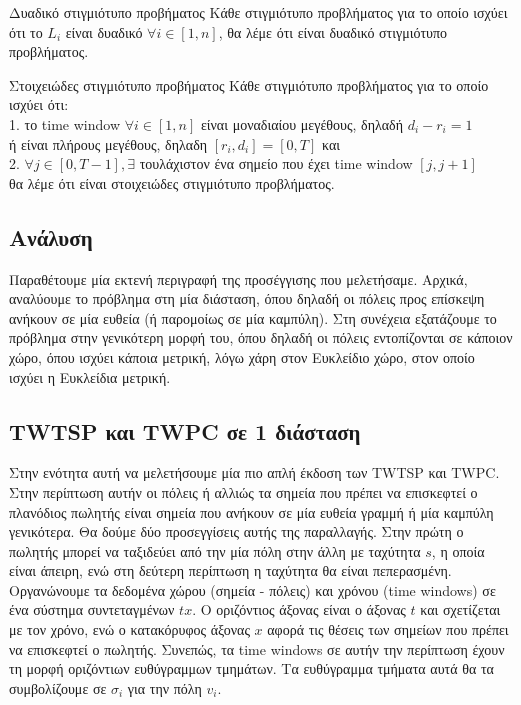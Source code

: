 \documentclass[oneside,12pt]{book}
\theoremstyle{definition}
\begin{document}
\begin{mydefinition}{Δυαδικό στιγμιότυπο προβήματος}{}
	Κάθε στιγμιότυπο προβλήματος για το οποίο ισχύει ότι το \(L_i\) είναι δυαδικό \(\forall i \in [1,n]\), θα λέμε ότι είναι δυαδικό στιγμιότυπο προβλήματος. 
\end{mydefinition}

\begin{mydefinition}{Στοιχειώδες στιγμιότυπο προβήματος}{}
	Κάθε στιγμιότυπο προβλήματος για το οποίο ισχύει ότι: \\
	1. το time window \(\forall i \in [1,n]\) είναι μοναδιαίου μεγέθους, δηλαδή \( d_i - r_i = 1 \) \\
	ή είναι πλήρους μεγέθους, δηλαδη \([r_i, d_i] = [0,T]\) και \\
	2. \(\forall j \in [0,T-1], \exists\) τουλάχιστον ένα σημείο που έχει time window \([j, j+1]\) \\
	θα λέμε ότι είναι στοιχειώδες στιγμιότυπο προβλήματος. 
\end{mydefinition}

\subsection{Ανάλυση}

Παραθέτουμε μία εκτενή περιγραφή της προσέγγισης που μελετήσαμε. Αρχικά, αναλύουμε το πρόβλημα στη μία διάσταση, όπου δηλαδή οι πόλεις προς επίσκεψη ανήκουν σε μία ευθεία (ή παρομοίως σε μία καμπύλη). Στη συνέχεια εξατάζουμε το πρόβλημα στην γενικότερη μορφή του, όπου δηλαδή οι πόλεις εντοπίζονται σε κάποιον χώρο, όπου ισχύει κάποια μετρική, λόγω χάρη στον Ευκλείδιο χώρο, στον οποίο ισχύει η Ευκλείδια μετρική. \\

\subsection{TWTSP και TWPC σε 1 διάσταση}

Στην ενότητα αυτή να μελετήσουμε μία πιο απλή έκδοση των TWTSP και TWPC. Στην περίπτωση αυτήν οι πόλεις ή αλλιώς τα σημεία που πρέπει να επισκεφτεί ο πλανόδιος πωλητής είναι σημεία που ανήκουν σε μία ευθεία γραμμή ή μία καμπύλη γενικότερα. Θα δούμε δύο προσεγγίσεις αυτής της παραλλαγής. Στην πρώτη ο πωλητής μπορεί να ταξιδεύει από την μία πόλη στην άλλη με ταχύτητα \(s\), η οποία είναι άπειρη, ενώ στη δεύτερη περίπτωση η ταχύτητα θα είναι πεπερασμένη. \\

Οργανώνουμε τα δεδομένα χώρου (σημεία - πόλεις) και χρόνου (time windows) σε ένα σύστημα συντεταγμένων \(tx\). Ο οριζόντιος άξονας είναι ο άξονας \(t\) και σχετίζεται με τον χρόνο, ενώ ο κατακόρυφος άξονας \(x\) αφορά τις θέσεις των σημείων που πρέπει να επισκεφτεί ο πωλητής. Συνεπώς, τα time windows σε αυτήν την περίπτωση έχουν τη μορφή οριζόντιων ευθύγραμμων τμημάτων. Τα ευθύγραμμα τμήματα αυτά θα τα συμβολίζουμε σε \(σ_i\) για την πόλη \(v_i\). \\
\end{document}

